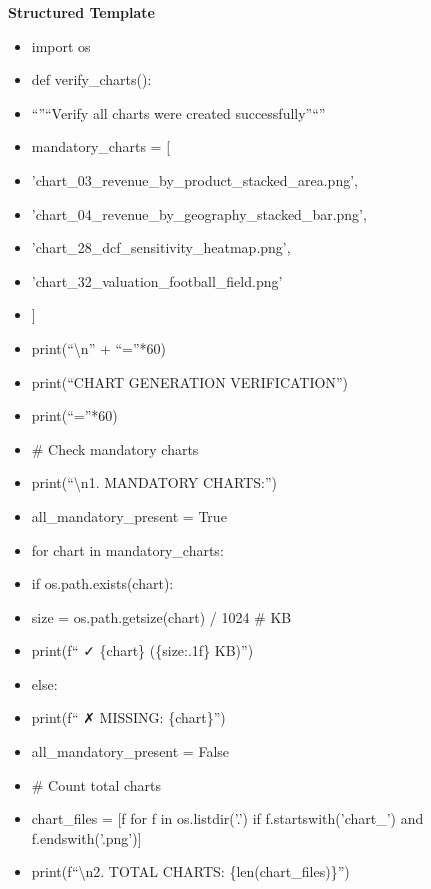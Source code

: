 \documentclass[11pt]{article}
\begin{document}
\textbf{Structured Template}
\begin{itemize}[leftmargin=*,itemsep=2pt,topsep=2pt]
\item {} import os
\item {} def verify\_\allowbreak{}charts():
\item {} ``''``Verify all charts were created successfully''``''
\item {} mandatory\_\allowbreak{}charts = [
\item {} 'chart\_\allowbreak{}03\_\allowbreak{}revenue\_\allowbreak{}by\_\allowbreak{}product\_\allowbreak{}stacked\_\allowbreak{}area.png',
\item {} 'chart\_\allowbreak{}04\_\allowbreak{}revenue\_\allowbreak{}by\_\allowbreak{}geography\_\allowbreak{}stacked\_\allowbreak{}bar.png',
\item {} 'chart\_\allowbreak{}28\_\allowbreak{}dcf\_\allowbreak{}sensitivity\_\allowbreak{}heatmap.png',
\item {} 'chart\_\allowbreak{}32\_\allowbreak{}valuation\_\allowbreak{}football\_\allowbreak{}field.png'
\item {} ]
\item {} print(``\textbackslash{}n'' + ``=''*60)
\item {} print(``CHART GENERATION VERIFICATION'')
\item {} print(``=''*60)
\item {} \# Check mandatory charts
\item {} print(``\textbackslash{}n1. MANDATORY CHARTS:'')
\item {} all\_\allowbreak{}mandatory\_\allowbreak{}present = True
\item {} for chart in mandatory\_\allowbreak{}charts:
\item {} if os.path.exists(chart):
\item {} size = os.path.getsize(chart) / 1024 \# KB
\item {} print(f`` ✓ \{chart\} (\{size:.1f\} KB)'')
\item {} else:
\item {} print(f`` ✗ MISSING: \{chart\}'')
\item {} all\_\allowbreak{}mandatory\_\allowbreak{}present = False
\item {} \# Count total charts
\item {} chart\_\allowbreak{}files = [f for f in os.listdir('.') if f.startswith('chart\_\allowbreak{}') and f.endswith('.png')]
\item {} print(f``\textbackslash{}n2. TOTAL CHARTS: \{len(chart\_\allowbreak{}files)\}'')

\end{itemize}
\end{document}

